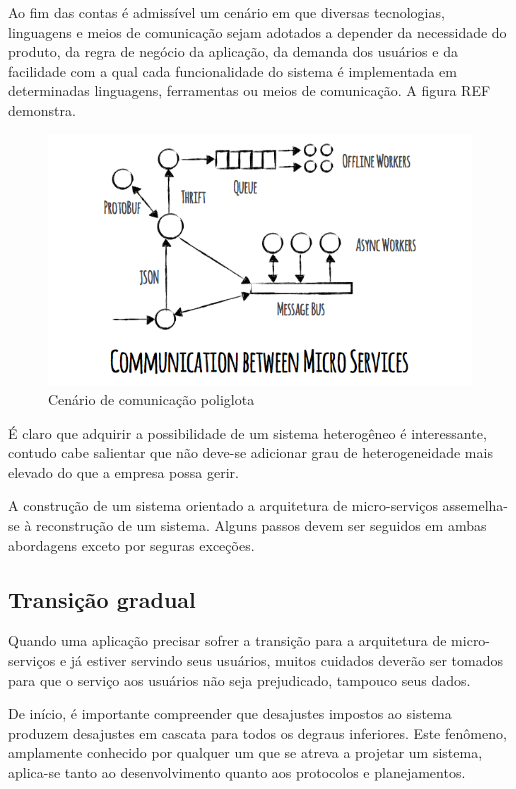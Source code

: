 Ao fim das contas é admissível um cenário em que diversas tecnologias, linguagens e meios de comunicação sejam adotados a depender da necessidade do produto, da regra de negócio da aplicação, da demanda dos usuários e da facilidade com a qual cada funcionalidade do sistema é implementada em determinadas linguagens, ferramentas ou meios de comunicação. A figura REF demonstra.

\begin{figure}
\centering
\includegraphics[width=14cm]{micro-service-architecture-comms}
\caption{Cenário de comunicação poliglota}
\end{figure}

É claro que adquirir a possibilidade de um sistema heterogêneo é interessante, contudo cabe salientar que não deve-se adicionar grau de heterogeneidade mais elevado do que a empresa possa gerir.

A construção de um sistema orientado a arquitetura de micro-serviços assemelha-se à reconstrução de um sistema. Alguns passos devem ser seguidos em ambas abordagens exceto por seguras exceções.

\subsection{Transição gradual}

Quando uma aplicação precisar sofrer a transição para a arquitetura de micro-serviços e já estiver servindo seus usuários, muitos cuidados deverão ser tomados para que o serviço aos usuários não seja prejudicado, tampouco seus dados.

De início, é importante compreender que desajustes impostos ao sistema produzem desajustes em cascata para todos os degraus inferiores. Este fenômeno, amplamente conhecido por qualquer um que se atreva a projetar um sistema, aplica-se tanto ao desenvolvimento quanto aos protocolos e planejamentos.

